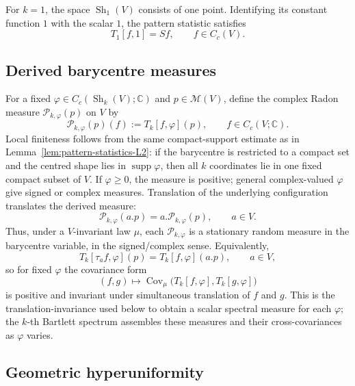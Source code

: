 \documentclass[11pt,reqno,a4paper]{amsart}
\numberwithin{equation}{section}
\theoremstyle{compact}
\theoremstyle{definition}
\theoremstyle{definition}
\newcommand{\Cov}{\operatorname{Cov}}
\newcommand{\cM}{\mathcal M}
\newcommand{\Sh}{\operatorname{Sh}}
\begin{document}
For $k=1$, the space $\Sh_1(V)$ consists of one point.  Identifying its
constant function $1$ with the scalar $1$, the pattern statistic satisfies
\begin{equation}\label{eq:first-order-pattern-statistic}
  T_1[f,1]=Sf,
  \qquad f\in C_c(V).
\end{equation}



\subsection{Derived barycentre measures}
\label{subsec:derived-barycentre}

For a fixed $\varphi\in C_c(\Sh_k(V);\mathbb C)$ and
$p\in\cM(V)$, define the complex Radon measure
$\mathcal P_{k,\varphi}(p)$ on $V$ by
\begin{equation}\label{eq:derived-barycentre-measure}
  \mathcal P_{k,\varphi}(p)(f):=T_k[f,\varphi](p),
  \qquad f\in C_c(V;\mathbb C).
\end{equation}
Local finiteness follows from the same compact-support estimate as in
Lemma~\ref{lem:pattern-statistics-L2}: if the barycentre is restricted to a
compact set and the centred shape lies in $\operatorname{supp}\varphi$, then
all $k$ coordinates lie in one fixed compact subset of $V$.  If
$\varphi\geq0$, the measure is positive; general complex-valued $\varphi$ give signed or complex measures.  Translation of the underlying configuration translates
the derived measure:
\begin{equation}\label{eq:derived-barycentre-equivariance}
  \mathcal P_{k,\varphi}(a.p)=a.\mathcal P_{k,\varphi}(p),
  \qquad a\in V.
\end{equation}
Thus, under a $V$-invariant law $\mu$, each
$\mathcal P_{k,\varphi}$ is a stationary random measure in the barycentre
variable, in the signed/complex sense.  Equivalently,
\[
  T_k[\tau_a f,\varphi](p)=T_k[f,\varphi](a.p),
  \qquad a\in V,
\]
so for fixed $\varphi$ the covariance form
\[
  (f,g)\longmapsto
  \Cov_\mu\bigl(T_k[f,\varphi],T_k[g,\varphi]\bigr)
\]
is positive and invariant under simultaneous translation of $f$ and $g$.
This is the translation-invariance used below to obtain a scalar spectral
measure for each $\varphi$; the $k$-th Bartlett spectrum assembles these
measures and their cross-covariances as $\varphi$ varies.

\subsection{Geometric hyperuniformity}
\label{subsec:geometric-hu}
\end{document}
